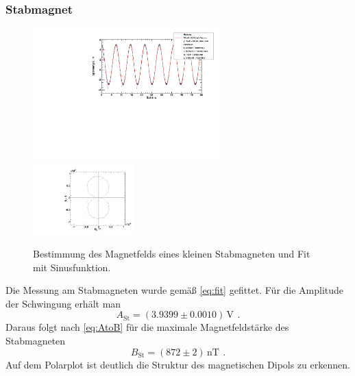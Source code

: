 \subsubsection{Stabmagnet}
\begin{figure}[H]
\begin{center}
  \includegraphics[width=0.64\textwidth]{../img/fit_Magnet.pdf}
  \includegraphics[width=0.35\textwidth]{../img/polar_Magnet.pdf}
  \caption{Bestimmung des Magnetfelds eines kleinen Stabmagneten und Fit mit Sinusfunktion.}
  \label{img:magnet}
\end{center}
\end{figure}
Die Messung am Stabmagneten wurde gemäß \autoref{eq:fit} gefittet.
Für die Amplitude der Schwingung erhält man
\begin{equation}
A_{\text{St}}=(3.9399 \pm 0.0010)\, \text{V} \ \, .
\end{equation}
Daraus folgt nach \autoref{eq:AtoB} für die maximale Magnetfeldstärke des Stabmagneten
\begin{equation}
B_{\text{St}} = (872 \pm 2)\,\text{nT} \ \, .
\end{equation}
Auf dem Polarplot ist deutlich die Struktur des magnetischen Dipols zu erkennen.


